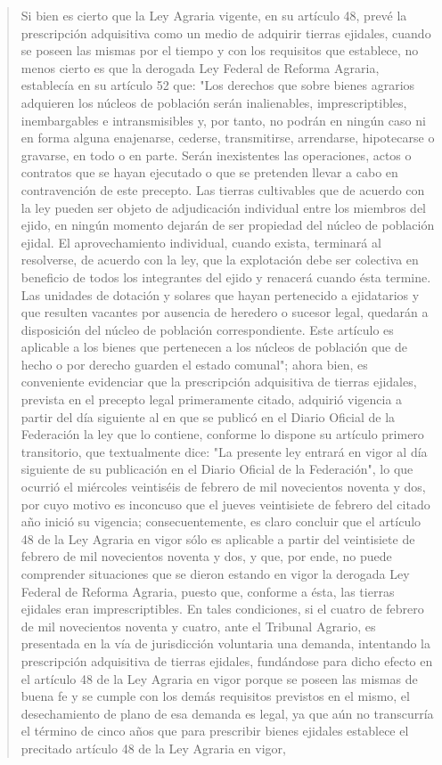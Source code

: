 \documentclass[11pt,a4paper]{article}
\begin{document}
\begin{quote}
Si bien es cierto que la Ley Agraria vigente, en su artículo 48, prevé la prescripción adquisitiva como
un medio de adquirir tierras ejidales, cuando se poseen las mismas por el tiempo y con los
requisitos que establece, no menos cierto es que la derogada Ley Federal de Reforma Agraria,
establecía en su artículo 52 que: "Los derechos que sobre bienes agrarios adquieren los núcleos de
población serán inalienables, imprescriptibles, inembargables e intransmisibles y, por tanto, no
podrán en ningún caso ni en forma alguna enajenarse, cederse, transmitirse, arrendarse,
hipotecarse o gravarse, en todo o en parte. Serán inexistentes las operaciones, actos o contratos
que se hayan ejecutado o que se pretenden llevar a cabo en contravención de este precepto. Las
tierras cultivables que de acuerdo con la ley pueden ser objeto de adjudicación individual entre los
miembros del ejido, en ningún momento dejarán de ser propiedad del núcleo de población ejidal. El
aprovechamiento individual, cuando exista, terminará al resolverse, de acuerdo con la ley, que la
explotación debe ser colectiva en beneficio de todos los integrantes del ejido y renacerá cuando
ésta termine. Las unidades de dotación y solares que hayan pertenecido a ejidatarios y que resulten
vacantes por ausencia de heredero o sucesor legal, quedarán a disposición del núcleo de población
correspondiente. Este artículo es aplicable a los bienes que pertenecen a los núcleos de población
que de hecho o por derecho guarden el estado comunal"; ahora bien, es conveniente evidenciar que
la prescripción adquisitiva de tierras ejidales, prevista en el precepto legal primeramente citado,
adquirió vigencia a partir del día siguiente al en que se publicó en el Diario Oficial de la Federación
la ley que lo contiene, conforme lo dispone su artículo primero transitorio, que textualmente dice: "La
presente ley entrará en vigor al día siguiente de su publicación en el Diario Oficial de la Federación",
lo que ocurrió el miércoles veintiséis de febrero de mil novecientos noventa y dos, por cuyo motivo
es inconcuso que el jueves veintisiete de febrero del citado año inició su vigencia;
consecuentemente, es claro concluir que el artículo 48 de la Ley Agraria en vigor sólo es aplicable a
partir del veintisiete de febrero de mil novecientos noventa y dos, y que, por ende, no puede
comprender situaciones que se dieron estando en vigor la derogada Ley Federal de Reforma
Agraria, puesto que, conforme a ésta, las tierras ejidales eran imprescriptibles. En tales condiciones,
si el cuatro de febrero de mil novecientos noventa y cuatro, ante el Tribunal Agrario, es presentada
en la vía de jurisdicción voluntaria una demanda, intentando la prescripción adquisitiva de tierras
ejidales, fundándose para dicho efecto en el artículo 48 de la Ley Agraria en vigor porque se poseen
las mismas de buena fe y se cumple con los demás requisitos previstos en el mismo, el
desechamiento de plano de esa demanda es legal, ya que aún no transcurría el término de cinco
años que para prescribir bienes ejidales establece el precitado artículo 48 de la Ley Agraria en vigor,



\end{quote}
\end{document}
